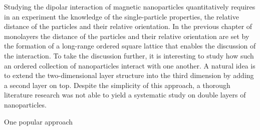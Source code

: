 \documentclass[\main/dresen_thesis.tex]{subfiles}
\begin{document}
  Studying the dipolar interaction of magnetic nanoparticles quantitatively requires in an experiment the knowledge of the single-particle properties, the relative distance of the particles and their relative orientation.
  In the previous chapter of monolayers the distance of the particles and their relative orientation are set by the formation of a long-range ordered square lattice that enables the discussion of the interaction.
  To take the discussion further, it is interesting to study how such an ordered collection of nanoparticles interact with one another.
  A natural idea is to extend the two-dimensional layer structure into the third dimension by adding a second layer on top.
  Despite the simplicity of this approach, a thorough literature research was not able to yield a systematic study on double layers of nanoparticles.

  One popular approach 
\end{document}
